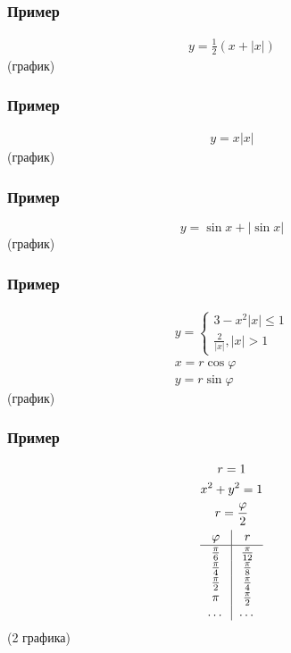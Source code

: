 \documentclass{article}
\begin{document}
\subsubsection{Пример}
\begin{gather*}
    y = \frac{1}{2} (x + |x|)
\end{gather*}
(график)

\subsubsection{Пример}
\begin{gather*}
    y = x |x|
\end{gather*}
(график)

\subsubsection{Пример}
\[
    y = \sin x + |\sin x|
\]
(график)

\subsubsection{Пример}
\begin{gather*}
    y = \begin{cases}
        3 - x^2 |x| \le 1\\
        \frac{2}{|x|}, |x| > 1
    \end{cases} \\
    x = r \cos \varphi \\
    y = r \sin \varphi
\end{gather*}
(график)

\subsubsection{Пример}
\begin{gather*}
    r = 1 \\
    x^2 + y^2 = 1 \\
    r = \frac{\varphi}{2} \\
    \begin{tabular}{c|c}
        $\varphi$ & $r$ \\
        \hline
        $\frac{\pi}{6}$ & $\frac{\pi}{12}$ \\
        $\frac{\pi}{4}$ & $\frac{\pi}{8} $ \\
        $\frac{\pi}{2}$ & $\frac{\pi}{4} $ \\
        $\pi          $ & $\frac{\pi}{2} $ \\
        \dots           & \dots
    \end{tabular}
\end{gather*}
(2 графика)
\end{document}
